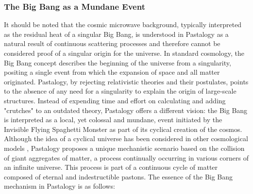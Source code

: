 \documentclass[pdflatex,sn-mathphys-num,referee]{sn-jnl}
\begin{document}
\subsubsection{The Big Bang as a Mundane Event}\label{subsubsec:big-bang}

It should be noted that the cosmic microwave background, typically interpreted as the residual heat of a singular Big Bang, is understood in Pastalogy as a natural result of continuous scattering processes and therefore cannot be considered proof of a singular origin for the universe.
In standard cosmology, the Big Bang concept describes the beginning of the universe from a singularity, positing a single event from which the expansion of space and all matter originated. Pastalogy, by rejecting relativistic theories and their postulates, points to the absence of any need for a singularity to explain the origin of large-scale structures. Instead of expending time and effort on calculating and adding "crutches" to an outdated theory, Pastalogy offers a different vision: the Big Bang is interpreted as a local, yet colossal and mundane, event initiated by the Invisible Flying Spaghetti Monster as part of its cyclical creation of the cosmos. Although the idea of a cyclical universe has been considered in other cosmological models \cite{steinhardt2007-cyclic}, Pastalogy proposes a unique mechanistic scenario based on the collision of giant aggregates of matter, a process continually occurring in various corners of an infinite universe.
This process is part of a continuous cycle of matter composed of eternal and indestructible pastons. The essence of the Big Bang mechanism in Pastalogy is as follows:
\end{document}
